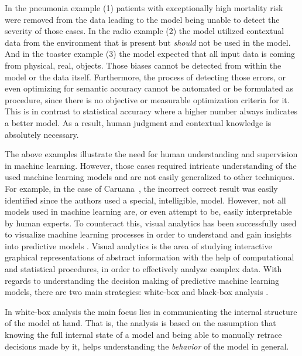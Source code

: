 In the pneumonia example (1) patients with exceptionally high mortality risk were removed from the data leading to the model being unable to detect the severity of those cases.
In the radio example (2) the model utilized contextual data from the environment that is present but \emph{should} not be used in the model.
And in the toaster example (3) the model expected that all input data is coming from physical, real, objects.
Those biases cannot be detected from within the model or the data itself.
Furthermore, the process of detecting those errors, or even optimizing for semantic accuracy cannot be automated or be formulated as procedure, since there is no objective or measurable optimization criteria for it.
This is in contrast to statistical accuracy where a higher number always indicates a better model.
As a result, human judgment and contextual knowledge is absolutely necessary.

The above examples illustrate the need for human understanding and supervision in machine learning.
However, those cases required intricate understanding of the used machine learning models and are not easily generalized to other techniques.
For example, in the case of Caruana~\etal\cite{Caruana:2015:IMH:2783258.2788613}, the incorrect correct result was easily identified since the authors used a special, intelligible, model.
However, not all models used in machine learning are, or even attempt to be, easily interpretable by human experts.
To counteract this, visual analytics has been successfully used to visualize machine learning processes in order to understand and gain insights into predictive models . Visual analytics is the area of studying interactive graphical representations of abstract information with the help of computational and statistical procedures, in order to effectively analyze complex data. With regards to understanding the decision making of predictive machine learning models, there are two main strategies: white-box and black-box analysis \cite{class_signatures}.

In white-box analysis the main focus lies in communicating the internal structure of the model at hand. That is, the analysis is based on the assumption that knowing the full internal state of a model and being able to manually retrace decisions made by it, helps understanding the \emph{behavior} of the model in general.

